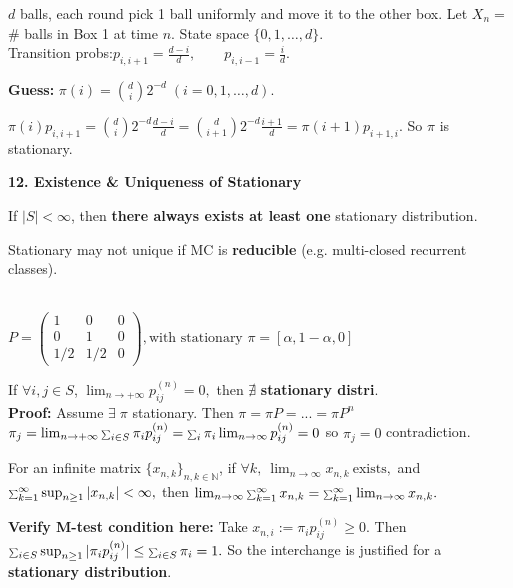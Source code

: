 \documentclass[a4paper, landscape]{article}
\newcommand{\topic}[1]{\par\medskip\textbf{#1}\par}
\newcommand{\subtopic}[1]{\par\textbf{#1}}
\newcommand{\smallsum}{\mathop{\scalebox{0.65}{$\sum$}}\nolimits}
\renewcommand{\topic}[1]{\par\medskip\noindent\colorbox{highlightcolor}{\parbox{\dimexpr\columnwidth-2\fboxsep\relax}{\textbf{#1}}}\par}
\renewcommand{\subtopic}[1]{\par\textbf{\color{blue}{#1}}} %
\begin{document}
\begin{multicols}{4}
\subtopic{Ehrenfest Urn Model:}
$d$ balls, each round pick 1 ball uniformly and move it to the other box. Let $X_n=$ \# balls in Box 1 at time $n$. State space $\{0,1,\dots,d\}$.\\
Transition probs:$p_{i,i+1}=\frac{d-i}{d},\qquad p_{i,i-1}=\frac{i}{d}$.

\textbf{Guess:} $\pi(i)=\binom{d}{i}2^{-d}\;(i=0,1,\dots,d)$.


\subtopic{Verify by detailed balance:}$\pi(i)p_{i,i+1}=\binom{d}{i}2^{-d}\frac{d-i}{d} =\binom{d}{i+1}2^{-d}\frac{i+1}{d}=\pi(i+1)p_{i+1,i}.$ So $\pi$ is stationary.


\topic{12. Existence \& Uniqueness of Stationary}
\subtopic{Finite space $|S|$ always Existence:}
If $|S|<\infty$, then \textbf{there always exists at least one} stationary distribution.

\subtopic{Not necessarily unique:}
Stationary may not unique if MC is \textbf{reducible} (e.g. multi-closed recurrent classes).

\subtopic{e.g. stationary that NOT unique:}\\
$
P=
\begin{pmatrix}
    1 & 0 & 0\\
    0 & 1 & 0\\
    1/2 & 1/2 & 0
\end{pmatrix}, \text{with stationary }
\pi=[\alpha,1-\alpha,0]
$

\subtopic{Vanishing probabilities $\Rightarrow$ no stationary distribution:}
If $\forall i,j\in S$, $\lim_{n\to +\infty}p^{(n)}_{ij}=0,$ then $\nexists$ \textbf{stationary distri}.\\
\textbf{Proof:} Assume $\exists\; \pi$ stationary. Then $\pi=\pi P=...=\pi P^n$\\
$\pi_j=\lim_{n\to +\infty}\smallsum_{i\in S}\pi_i p^{(n)}_{ij}=
\smallsum_i \pi_i \lim_{n\to\infty}p^{(n)}_{ij}=0$
so $\pi_j=0$ contradiction.\\
\subtopic{M-test(justify $\lim \smallsum = \smallsum \lim$):}
For an infinite matrix $\{x_{n,k}\}_{n,k\in\mathbb N}$, if
$\forall k,\ \lim_{n\to\infty}x_{n,k}\ \text{exists},$ and 
$\smallsum_{k=1}^\infty \sup_{n\ge1}|x_{n,k}|<\infty,$ then $\lim_{n\to\infty}\smallsum_{k=1}^\infty x_{n,k} =
\smallsum_{k=1}^\infty \lim_{n\to\infty}x_{n,k}.$


\textbf{Verify M-test condition here:}
Take $x_{n,i}:=\pi_i p^{(n)}_{ij}\ge 0$. Then
$\smallsum_{i\in S}\sup_{n\ge1}|\pi_i p^{(n)}_{ij}|
\le \smallsum_{i\in S}\pi_i=1.$
So the interchange is justified for a \textbf{stationary distribution}.


\end{multicols}
\end{document}
